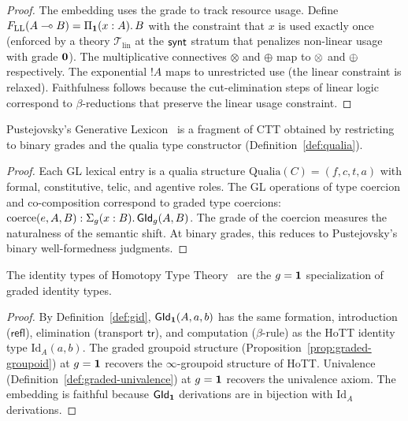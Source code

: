 \begin{proof}
The embedding uses the grade to track resource usage.
Define $F_{\mathrm{LL}}(A \multimap B) = \Pi_{\mathbf{1}}(x : A).\, B$
with the constraint that $x$ is used exactly once (enforced by a
theory $\mathcal{T}_{\mathrm{lin}}$ at the $\mathsf{synt}$ stratum that
penalizes non-linear usage with grade $\mathbf{0}$).
The multiplicative connectives $\otimes$ and $\oplus$ map to
$\otimes$ and $\oplus$ respectively.  The exponential $!A$ maps to
unrestricted use (the linear constraint is relaxed).  Faithfulness
follows because the cut-elimination steps of linear logic correspond
to $\beta$-reductions that preserve the linear usage constraint.
\end{proof}

\begin{theorem}
\label{thm:sub-gl}
Pustejovsky's Generative Lexicon~\cite{pustejovsky1995} is a
fragment of CTT obtained by restricting to binary grades and the
qualia type constructor (Definition~\ref{def:qualia}).
\end{theorem}

\begin{proof}
Each GL lexical entry is a qualia structure
$\mathrm{Qualia}(C) = (f, c, t, a)$ with formal, constitutive,
telic, and agentive roles.  The GL operations of type coercion
and co-composition correspond to graded type coercions:
$\mathrm{coerce}(e, A, B) : \Sigma_g(x : B).\, \mathsf{GId}_g(A, B)$.
The grade of the coercion measures the naturalness of the
semantic shift.  At binary grades, this reduces to Pustejovsky's
binary well-formedness judgments.
\end{proof}

\begin{theorem}
\label{thm:sub-hott}
The identity types of Homotopy Type Theory~\cite{hott2013} are the
$g = \mathbf{1}$ specialization of graded identity types.
\end{theorem}

\begin{proof}
By Definition~\ref{def:gid}, $\mathsf{GId}_{\mathbf{1}}(A, a, b)$ has the same
formation, introduction ($\mathsf{refl}$), elimination (transport
$\mathsf{tr}$), and computation ($\beta$-rule) as the HoTT identity
type $\mathrm{Id}_A(a,b)$.  The graded groupoid structure
(Proposition~\ref{prop:graded-groupoid}) at $g = \mathbf{1}$ recovers
the $\infty$-groupoid structure of HoTT.  Univalence
(Definition~\ref{def:graded-univalence}) at $g = \mathbf{1}$ recovers
the univalence axiom.  The embedding is faithful because
$\mathsf{GId}_{\mathbf{1}}$ derivations are in bijection with $\mathrm{Id}_A$
derivations.
\end{proof}

